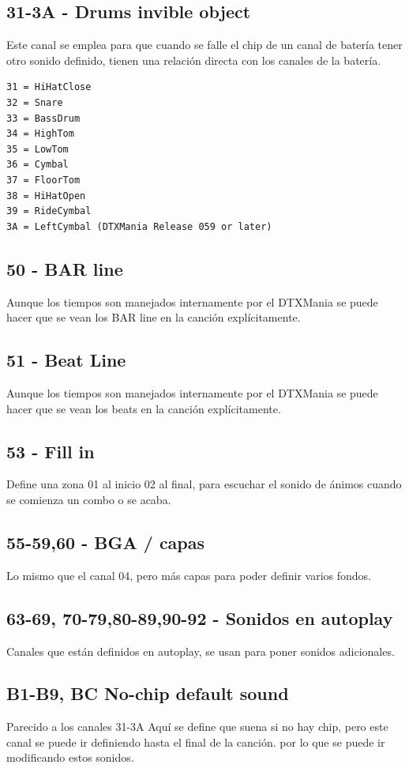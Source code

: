 \documentclass[a4paper,11pt,oneside]{book}
\begin{document}
\subsection{31-3A - Drums invible object}
Este canal se emplea para que cuando se falle el chip de un canal de batería tener otro sonido definido, tienen una relación directa con los canales de la batería.

\begin{Verbatim}[frame=single]
31 = HiHatClose
32 = Snare
33 = BassDrum
34 = HighTom
35 = LowTom
36 = Cymbal
37 = FloorTom
38 = HiHatOpen
39 = RideCymbal
3A = LeftCymbal (DTXMania Release 059 or later)
\end{Verbatim}

\subsection{50 - BAR line}
Aunque los tiempos son manejados internamente por el DTXMania se puede hacer que se vean los BAR line en la canción explícitamente.

\subsection{51 - Beat Line}
Aunque los tiempos son manejados internamente por el DTXMania se puede hacer que se vean los beats en la canción explícitamente.

\subsection{53 - Fill in}
Define una zona 01 al inicio 02 al final, para escuchar el sonido de ánimos cuando se comienza un combo o se acaba.

\subsection{55-59,60 - BGA / capas}
Lo mismo que el canal 04, pero más capas para poder definir varios fondos.


\subsection{63-69, 70-79,80-89,90-92 - Sonidos en autoplay}
Canales que están definidos en autoplay, se usan para poner sonidos adicionales.

\subsection{B1-B9, BC No-chip default sound}
Parecido a los canales 31-3A
Aquí se define que suena si no hay chip, pero este canal se puede ir definiendo hasta el final de la canción. por lo que se puede ir modificando estos sonidos.
\end{document}
